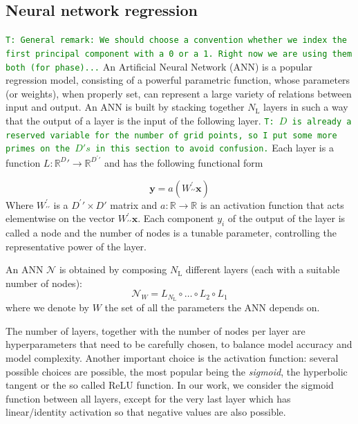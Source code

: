 \documentclass[twocolumn,showpacs,preprintnumbers,nofootinbib,prd,
superscriptaddress,10pt]{revtex4-1}
\newcommand{\R}{\mathbb{R}}
\newcommand{\tim}[1]{{\textcolor{green}{\texttt{T: #1}} }}
\begin{document}
\subsection{Neural network regression}
\label{sec:NN}

\tim{General remark: We should choose a convention whether we index the first principal component with a 0 or a 1. Right now we are using them both (for phase)...}
An Artificial Neural Network (ANN) is a popular regression model, consisting of a powerful parametric function, whose parameters (or weights), when properly set, can represent a large variety of relations between input and output.
An ANN is built by stacking together $N_\text{L}$ layers in such a way that the output of a layer is the input of the following layer. \tim{$D$ is already a reserved variable for the number of grid points, so I put some more primes on the $D's$ in this section to avoid confusion.} Each layer is a function $L: \R^D\prime \rightarrow \R^{D^\prime\prime} $ and has the following functional form

\begin{equation}
	\boldsymbol{y} = a(W^{\prime}_{\prime\prime}\boldsymbol{x})
\end{equation}
%
Where $W^{\prime}_{\prime\prime}$ is a $D^\prime\prime \times D\prime$ matrix and $a: \R \rightarrow \R$ is an activation function that acts elementwise on the vector $W^{\prime}_{\prime\prime}\boldsymbol{x}$.
Each component $y_i$ of the output of the layer is called a node and the number of nodes is a tunable parameter, controlling the representative power of the layer.

An ANN $\mathcal{N}$ is obtained by composing $N_\text{L}$ different layers (each with a suitable number of nodes):
%
\begin{equation}
	\mathcal{N}_W = L_{N_\text{L}} \circ \hdots \circ L_2 \circ L_1
\end{equation}
%
where we denote by $W$ the set of all the parameters the ANN depends on.

The number of layers, together with the number of nodes per layer are hyperparameters that need to be carefully chosen, to balance model accuracy and model complexity.
Another important choice is the activation function: several possible choices are possible, the most popular being the {\it sigmoid}, the hyperbolic tangent or the so called ReLU function. In our work, we consider the sigmoid function between all layers, except for the very last layer which has linear/identity activation so that negative values are also possible.
\end{document}
